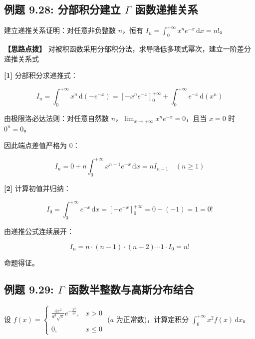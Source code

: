 \documentclass[11pt,a4paper,UTF8]{ctexart}
\begin{document}
\subsection{例题 9.28: 分部积分建立 $\Gamma$ 函数递推关系}

建立递推关系证明：对任意非负整数 $n$，恒有 $I_n = \int_0^{+\infty} x^n e^{-x}\,\mathrm{d}x = n!$。

\textbf{\color{DeepPurple}【思路点拨】} 对被积函数采用分部积分法，求导降低多项式幂次，建立一阶差分递推关系式


\begin{solbox}[分步推导与答题规范]
\textbf{[1]} 分部积分求递推式：


\begin{equation*}
I_n = \int_0^{+\infty} x^n\,\mathrm{d}(-e^{-x}) = \left[ -x^n e^{-x} \right]_0^{+\infty} + \int_0^{+\infty} e^{-x}\,\mathrm{d}(x^n)
\end{equation*}


由极限洛必达法则：对任意自然数 $n$，$\lim_{x \to +\infty} x^n e^{-x} = 0$，且当 $x=0$ 时 $0^n = 0$。

因此端点差值严格为 0：


\begin{equation*}
I_n = 0 + n\int_0^{+\infty} x^{n-1}e^{-x}\,\mathrm{d}x = n I_{n-1} \quad (n \geqslant 1)
\end{equation*}


\textbf{[2]} 计算初值并归纳：


\begin{equation*}
I_0 = \int_0^{+\infty} e^{-x}\,\mathrm{d}x = \left[ -e^{-x} \right]_0^{+\infty} = 0 - (-1) = 1 = 0!
\end{equation*}


由递推公式连续展开：


\begin{equation*}
I_n = n \cdot (n-1) \cdot (n-2) \cdots 1 \cdot I_0 = n!
\end{equation*}


命题得证。
\end{solbox}


\subsection{例题 9.29: $\Gamma$ 函数半整数与高斯分布结合}

设 $f(x) = \begin{cases} \frac{4x^2}{a^3\sqrt{\pi}} e^{-\frac{x^2}{a^2}}, & x > 0 \\ \\ 0, & x \leqslant 0 \end{cases}$ ($a$ 为正常数)，计算定积分 $\int_0^{+\infty} x^2 f(x)\,\mathrm{d}x$。
\end{document}
